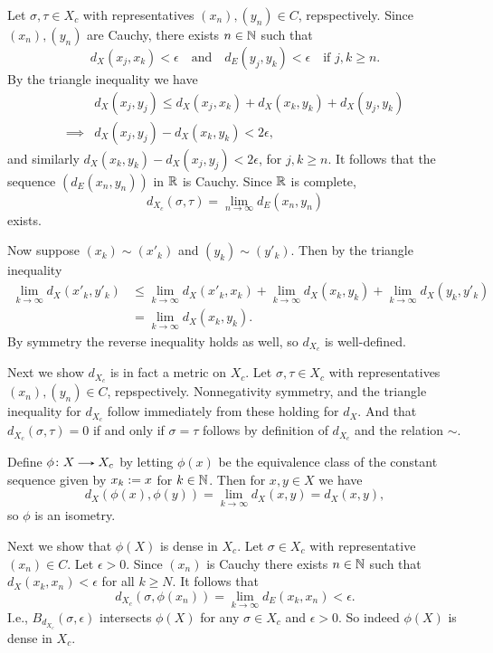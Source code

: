 \begin{nothing}
  Let $\sigma, \tau \in X_c$ with representatives $(x_n),(y_n) \in C$,
  repspectively. Since $(x_n),(y_n)$ are Cauchy, there exists $n \in
  \mathbb{N}$ such that
  \[
  d_X(x_j,x_k) < \epsilon \quad\text{and}\quad d_E(y_j,y_k) < \epsilon
  \quad\text{if } j,k \ge n.
  \]
  By the triangle inequality we have
  \begin{align*}
  &d_X(x_j,y_j) \le d_X(x_j,x_k) + d_X(x_k,y_k) + d_X(y_j,y_k)
    \\ \implies &d_X(x_j,y_j) - d_X(x_k,y_k) < 2\epsilon,
  \end{align*}
  and similarly $d_X(x_k,y_k) - d_X(x_j,y_j) < 2\epsilon$, for $j,k
  \ge n$.  It follows that the sequence $(d_E(x_n,y_n))$ in $\mathbb{R}$ is
  Cauchy. Since $\mathbb{R}$ is complete,
  \[
  d_{X_c}(\sigma, \tau) = \lim_{n \to \infty} d_E(x_n,y_n)
  \]
  exists.

  Now suppose $(x_k) \sim (x'_k)$ and $(y_k) \sim (y'_k)$. Then by the
  triangle inequality
  \begin{align*}
    \lim_{k \to \infty} d_X(x'_k, y'_k) &\le \lim_{k \to \infty}
    d_X(x'_k, x_k) + \lim_{k \to \infty} d_X(x_k, y_k) + \lim_{k \to
      \infty} d_X(y_k, y'_k) \\ &= \lim_{k \to \infty} d_X(x_k, y_k).
  \end{align*}
  By symmetry the reverse inequality holds as well, so $d_{X_c}$ is
  well-defined.
\end{nothing}

\begin{nothing}
  Next we show $d_{X_c}$ is in fact a metric on $X_c$. Let
  $\sigma,\tau \in X_c$ with representatives $(x_n),(y_n) \in C$,
  repspectively. Nonnegativity symmetry, and the triangle inequality
  for $d_{X_c}$ follow immediately from these holding for $d_X$. And
  that $d_{X_c}(\sigma, \tau) = 0$ if and only if $\sigma = \tau$
  follows by definition of $d_{X_c}$ and the relation $\sim$.
\end{nothing}

\begin{nothing}
  Define $\phi \c X \to X_c$ by letting $\phi(x)$ be the equivalence
  class of the constant sequence given by $x_k \mathrel{:=} x$ for $k \in
  \mathbb{N}$. Then for $x,y \in X$ we have
  \[
  d_X(\phi(x),\phi(y)) = \lim_{k \to \infty} d_X(x,y) = d_X(x,y),
  \]
  so $\phi$ is an isometry.

  Next we show that $\phi(X)$ is dense in $X_c$. Let $\sigma \in X_c$
  with representative $(x_n) \in C$. Let $\epsilon > 0$. Since $(x_n)$
  is Cauchy there exists $n \in \mathbb{N}$ such that $d_X(x_k,x_n) <
  \epsilon$ for all $k \ge N$. It follows that
  \[
  d_{X_c}(\sigma, \phi(x_n)) = \lim_{k \to \infty} d_E(x_k, x_n) <
  \epsilon.
  \]
  I.e., $B_{d_{X_c}}(\sigma, \epsilon)$ intersects $\phi(X)$ for any
  $\sigma \in X_c$ and $\epsilon > 0$. So indeed $\phi(X)$ is dense in
  $X_c$.
\end{nothing}

